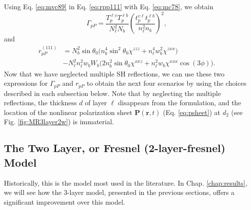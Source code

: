 Using Eq. \eqref{eq:mvc89} in Eq. \eqref{eq:rpp111} with Eq. \eqref{eq:mc78}, we
obtain
\begin{equation}\label{eq:gamma111nomr}
\Gamma_{pP}=
\frac{T_{p}^{\ell v}T^{\ell b}_{p}}{N^{2}_{\ell}N_{b}}
\left(\frac{t_{p}^{v\ell}t^{\ell b}_{p}}{n^{2}_{\ell}n_{b}}\right)^{2},  
\end{equation}
and
\begin{equation}\label{eq:rpp111nomr}
\begin{split}
r^{(111)}_{pP}& =
N^{2}_{b}\sin\theta_{0}
\Big(
  n^{4}_{b}\sin^{2}\theta_{0}\chi^{zzz} + n^{4}_{\ell}w^2_{b}\chi^{zxx}
\Big)\\
&- N^{2}_{\ell}n^{2}_{\ell}w_{b}W_{b}
\Big(
  2n^{2}_{b}\sin\theta_{0}\chi^{xxz} + n^{2}_{\ell}w_{b}\chi^{xxx}\cos(3\phi) 
\Big).
\end{split}
\end{equation}
Now that we have neglected multiple SH reflections, we can use these two
expressions for $\Gamma_{pP}$ and $r_{pP}$ to obtain the next four scenarios by
using the choices described in each subsection below. Note that by neglecting
the multiple reflections, the thickness $d$ of layer $\ell$ disappears from the
formulation, and the location of the nonlinear polarization sheet
$\mathbf{P}(\mathbf{r},t)$ (Eq. \eqref{eq:psheet}) at $d_{2}$ (see Fig.
\ref{fig:MR3layer2w}) is immaterial.



\subsection{The Two Layer, or Fresnel (2-layer-fresnel) Model}
\label{sec:2-layer-fresnel}

Historically, this is the model most used in the literature. In Chap.
\ref{chap:results}, we will see how the 3-layer model, presented in the previous
sections, offers a significant improvement over this model. 

